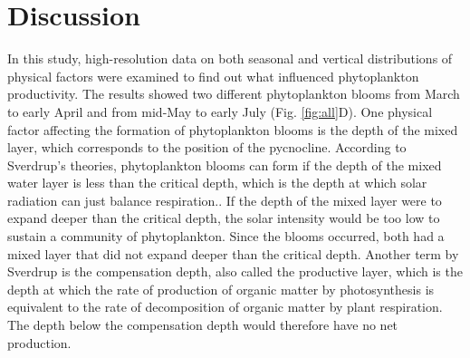 \documentclass[../Main.tex]{subfiles}
\begin{document}
\section*{\crule[blue]{.3cm}{.3cm} Discussion}
In this study, high-resolution data on both seasonal and vertical distributions of physical factors were examined to find out what influenced phytoplankton productivity. The results showed two different phytoplankton blooms from March to early April and from mid-May to early July (Fig. \ref{fig:all}D). One physical factor affecting the formation of phytoplankton blooms is the depth of the mixed layer, which corresponds to the position of the pycnocline.  
According to Sverdrup's theories, phytoplankton blooms can form if the depth of the mixed water layer is less than the critical depth, which is the depth at which solar radiation can just balance respiration.\supercite{Sverdrup1953OnCF}. If the depth of the mixed layer were to expand deeper than the critical depth, the solar intensity would be too low to sustain a community of phytoplankton. Since the blooms occurred, both had a mixed layer that did not expand deeper than the critical depth. Another term by Sverdrup is the compensation depth, also called the productive layer, which is the depth at which the rate of production of organic matter by photosynthesis is equivalent to the rate of decomposition of organic matter by plant respiration\supercite{Sverdrup1953OnCF}. 
The depth below the compensation depth would therefore have no net production. 
\end{document}
